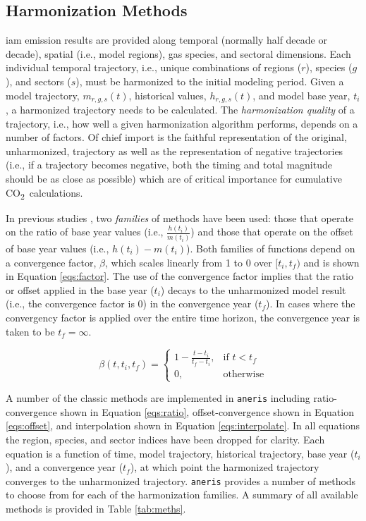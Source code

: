 \documentclass[review]{elsarticle}
\newcommand{\code}[1]{\lstinline[basicstyle=\ttfamily\color{black}]|#1|}
\newcommand{\codeb}[1]{\texttt{#1}}
\newcommand{\cotwo}{CO\textsubscript{2}~}
\begin{document}
\subsection{Harmonization Methods}

\gls{iam} emission results are provided along temporal (normally half decade or
decade), spatial (i.e., model regions), gas species, and sectoral
dimensions. Each individual temporal trajectory, i.e., unique combinations of
regions ($r$), species ($g$), and sectors ($s$), must be harmonized to the
initial modeling period. Given a model trajectory, $m_{r, g, s}(t)$, historical
values, $h_{r, g, s}(t)$, and model base year, $t_i$, a harmonized trajectory
needs to be calculated. The \textit{harmonization quality} of a trajectory,
i.e., how well a given harmonization algorithm performs, depends on a number of
factors. Of chief import is the faithful representation of the original,
unharmonized, trajectory as well as the representation of negative trajectories
(i.e., if a trajectory becomes negative, both the timing and total magnitude
should be as close as possible) which are of critical importance for cumulative
\cotwo calculations.

In previous studies \cite{meinshausen_rcp_2011,rogelj_discrepancies_2011}, two
\textit{families} of methods have been used: those that operate on the ratio of
base year values (i.e., $\frac{h(t_i)}{m(t_i)}$) and those that operate on the
offset of base year values (i.e., $h(t_i) - m(t_i)$). Both families of functions
depend on a convergence factor, $\beta$, which scales linearly from 1 to 0 over
$[t_i, t_f)$ and is shown in Equation \ref{eqs:factor}. The use of the
  convergence factor implies that the ratio or offset applied in the base year
  ($t_i$) decays to the unharmonized model result (i.e., the convergence factor
  is 0) in the convergence year ($t_f$). In cases where the convergency factor
  is applied over the entire time horizon, the convergence year is taken to be
  $t_f = \infty$.

\begin{equation}\label{eqs:factor}
  \beta(t, t_i, t_f) =
  \begin{cases}
    1 - \frac{t - t_i}{t_f - t_i},& \text{if } t < t_f\\
    0,                        & \text{otherwise}
  \end{cases}
\end{equation}

A number of the classic methods are implemented in \code{aneris} including
ratio-convergence shown in Equation \ref{eqs:ratio}, offset-convergence shown in
Equation \ref{eqs:offset}, and interpolation shown in Equation
\ref{eqs:interpolate}. In all equations the region, species, and sector indices
have been dropped for clarity. Each equation is a function of time, model
trajectory, historical trajectory, base year ($t_i$), and a convergence year
($t_f$), at which point the harmonized trajectory converges to the unharmonized
trajectory. \codeb{aneris} provides a number of methods to choose from for each
of the harmonization families. A summary of all available methods is provided in
Table \ref{tab:meths}. 
\end{document}
